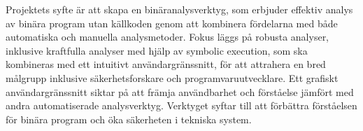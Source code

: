 Projektets syfte är att skapa en binäranalysverktyg, som erbjuder effektiv
analys av binära program utan källkoden genom att kombinera fördelarna med både
automatiska och manuella analysmetoder. Fokus läggs på robusta analyser,
inklusive kraftfulla analyser med hjälp av symbolic execution, som ska
kombineras med ett intuitivt användargränssnitt, för att attrahera en bred
målgrupp inklusive säkerhetsforskare och programvaruutvecklare. Ett grafiskt
användargränssnitt siktar på att främja användbarhet och förståelse jämfört med
andra automatiserade analysverktyg. Verktyget syftar till att förbättra
förståelsen för binära program och öka säkerheten i tekniska system.
